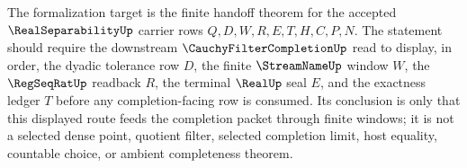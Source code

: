 The formalization target is the finite handoff theorem for the accepted $\RealSeparabilityUp$ carrier rows $Q,D,W,R,E,T,H,C,P,N$. The statement should require the downstream $\CauchyFilterCompletionUp$ read to display, in order, the dyadic tolerance row $D$, the finite $\StreamNameUp$ window $W$, the $\RegSeqRatUp$ readback $R$, the terminal $\RealUp$ seal $E$, and the exactness ledger $T$ before any completion-facing row is consumed. Its conclusion is only that this displayed route feeds the completion packet through finite windows; it is not a selected dense point, quotient filter, selected completion limit, host equality, countable choice, or ambient completeness theorem.
